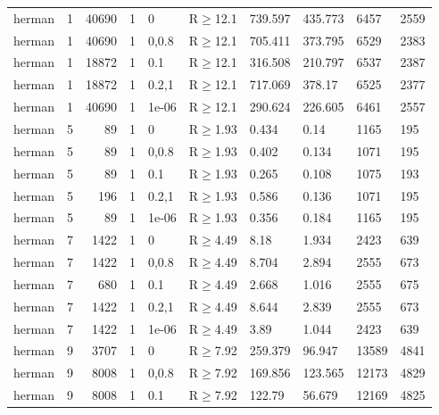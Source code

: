 \begin{longtable}{llrrllllll}
 herman        & 1        &  	40690 & 1 & 0     & R$\geq$12.1  & 739.597  & 435.773  & 6457    & 2559    \\
 herman        & 1        &  	40690 & 1 & 0,0.8 & R$\geq$12.1  & 705.411  & 373.795  & 6529    & 2383    \\
 herman        & 1        &  	18872 & 1 & 0.1   & R$\geq$12.1  & 316.508  & 210.797  & 6537    & 2387    \\
 herman        & 1        &  	18872 & 1 & 0.2,1 & R$\geq$12.1  & 717.069  & 378.17   & 6525    & 2377    \\
 herman        & 1        &  	40690 & 1 & 1e-06 & R$\geq$12.1  & 290.624  & 226.605  & 6461    & 2557    \\
 herman        & 5        &     	89 & 1 & 0     & R$\geq$1.93  & 0.434    & 0.14     & 1165    & 195     \\
 herman        & 5        &     	89 & 1 & 0,0.8 & R$\geq$1.93  & 0.402    & 0.134    & 1071    & 195     \\
 herman        & 5        &     	89 & 1 & 0.1   & R$\geq$1.93  & 0.265    & 0.108    & 1075    & 193     \\
 herman        & 5        &    	196 & 1 & 0.2,1 & R$\geq$1.93  & 0.586    & 0.136    & 1071    & 195     \\
 herman        & 5        &     	89 & 1 & 1e-06 & R$\geq$1.93  & 0.356    & 0.184    & 1165    & 195     \\
 herman        & 7        &   	1422 & 1 & 0     & R$\geq$4.49  & 8.18     & 1.934    & 2423    & 639     \\
 herman        & 7        &   	1422 & 1 & 0,0.8 & R$\geq$4.49  & 8.704    & 2.894    & 2555    & 673     \\
 herman        & 7        &    	680 & 1 & 0.1   & R$\geq$4.49  & 2.668    & 1.016    & 2555    & 675     \\
 herman        & 7        &   	1422 & 1 & 0.2,1 & R$\geq$4.49  & 8.644    & 2.839    & 2555    & 673     \\
 herman        & 7        &   	1422 & 1 & 1e-06 & R$\geq$4.49  & 3.89     & 1.044    & 2423    & 639     \\
 herman        & 9        &   	3707 & 1 & 0     & R$\geq$7.92  & 259.379  & 96.947   & 13589   & 4841    \\
 herman        & 9        &   	8008 & 1 & 0,0.8 & R$\geq$7.92  & 169.856  & 123.565  & 12173   & 4829    \\
 herman        & 9        &   	8008 & 1 & 0.1   & R$\geq$7.92  & 122.79   & 56.679   & 12169   & 4825    \\

\end{longtable}
